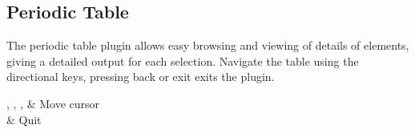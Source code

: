 \subsection{Periodic Table}

The periodic table plugin allows easy browsing and viewing of details of elements, giving a detailed output for each selection. Navigate the table using the directional keys, pressing back or exit exits the plugin.

\begin{btnmap}
  \PluginUp, \PluginDown, \PluginLeft, \PluginRight
  & Move cursor\\

  \PluginCancel
  & Quit\\
\end{btnmap}
